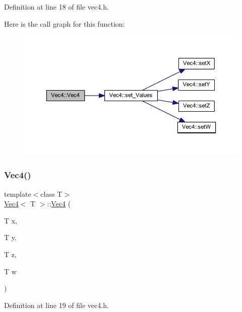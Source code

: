 Definition at line 18 of file vec4.\+h.

Here is the call graph for this function\+:
\nopagebreak
\begin{figure}[H]
\begin{center}
\leavevmode
\includegraphics[width=350pt]{class_vec4_ad342af37b73f64d7cea0cef986f5c959_cgraph}
\end{center}
\end{figure}
\mbox{\label{class_vec4_adcfec79e821f101e76ff6bc39f170b3b}} 
\subsubsection{\texorpdfstring{Vec4()}{Vec4()}\hspace{0.1cm}{\footnotesize\ttfamily [2/4]}}
{\footnotesize\ttfamily template$<$class T$>$ \\
\mbox{\hyperlink{class_vec4}{Vec4}}$<$ T $>$\+::\mbox{\hyperlink{class_vec4}{Vec4}} (\begin{DoxyParamCaption}\item[{T}]{x,  }\item[{T}]{y,  }\item[{T}]{z,  }\item[{T}]{w }\end{DoxyParamCaption})\hspace{0.3cm}{\ttfamily [inline]}}



Definition at line 19 of file vec4.\+h.

